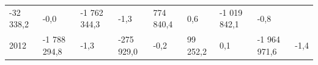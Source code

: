 \begin{longtable}[]{@{}lllllllll@{}}
\begin{minipage}[t]{0.10\columnwidth}
-32 338,2\strut
\end{minipage} & \begin{minipage}[t]{0.06\columnwidth}\raggedright
-0,0\strut
\end{minipage} & \begin{minipage}[t]{0.16\columnwidth}\raggedright
-1 762 344,3\strut
\end{minipage} & \begin{minipage}[t]{0.06\columnwidth}\raggedright
-1,3\strut
\end{minipage} & \begin{minipage}[t]{0.12\columnwidth}\raggedright
774 840,4\strut
\end{minipage} & \begin{minipage}[t]{0.06\columnwidth}\raggedright
0,6\strut
\end{minipage} & \begin{minipage}[t]{0.10\columnwidth}\raggedright
-1 019 842,1\strut
\end{minipage} & \begin{minipage}[t]{0.06\columnwidth}\raggedright
-0,8\strut
\end{minipage}\tabularnewline
\begin{minipage}[t]{0.05\columnwidth}\raggedright
2012\strut
\end{minipage} & \begin{minipage}[t]{0.10\columnwidth}\raggedright
-1 788 294,8\strut
\end{minipage} & \begin{minipage}[t]{0.06\columnwidth}\raggedright
-1,3\strut
\end{minipage} & \begin{minipage}[t]{0.16\columnwidth}\raggedright
-275 929,0\strut
\end{minipage} & \begin{minipage}[t]{0.06\columnwidth}\raggedright
-0,2\strut
\end{minipage} & \begin{minipage}[t]{0.12\columnwidth}\raggedright
99 252,2\strut
\end{minipage} & \begin{minipage}[t]{0.06\columnwidth}\raggedright
0,1\strut
\end{minipage} & \begin{minipage}[t]{0.10\columnwidth}\raggedright
-1 964 971,6\strut
\end{minipage} & \begin{minipage}[t]{0.06\columnwidth}\raggedright
-1,4\strut

\end{minipage}
\end{longtable}
